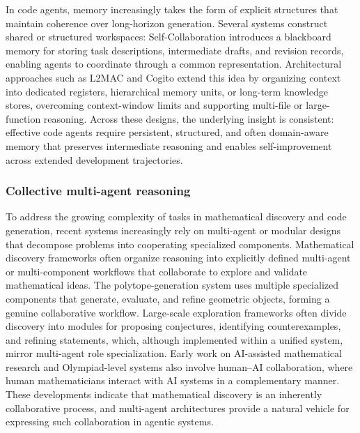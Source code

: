 In code agents, memory increasingly takes the form of explicit structures that maintain coherence
over long-horizon generation. Several systems construct shared or structured workspaces: 
Self-Collaboration \citep{dong2024self} introduces a blackboard memory for storing task descriptions,
intermediate drafts, and revision records, enabling agents to coordinate through a common 
representation. Architectural approaches such as L2MAC \citep{holt2023l2mac} and Cogito 
\citep{li2025cogito} extend this idea by organizing context into dedicated registers, hierarchical 
memory units, or long-term knowledge stores, overcoming context-window limits and supporting 
multi-file or large-function reasoning. Across these designs, the underlying insight is consistent: effective code agents require 
persistent, structured, and often domain-aware memory that preserves intermediate reasoning and 
enables self-improvement across extended development trajectories.





\subsubsection{Collective multi-agent reasoning}
\label{sec:app-math-collaboration}
To address the growing complexity of tasks in mathematical discovery and code generation, recent 
systems increasingly rely on multi-agent or modular designs that decompose problems into 
cooperating specialized components. Mathematical discovery frameworks often organize reasoning into explicitly defined 
multi-agent or multi-component workflows that collaborate to explore and validate mathematical ideas. The polytope-generation system \citep{swirszcz2025advancing} uses multiple specialized components that generate, evaluate, and refine geometric objects, forming a genuine collaborative workflow. Large-scale exploration frameworks \citep{georgiev2025mathematical} often divide discovery into modules for proposing conjectures, identifying counterexamples, and refining statements, which, although implemented within a unified system, mirror multi-agent role specialization. Early work on AI-assisted mathematical research \citep{davies2021advancing} and Olympiad-level systems \citep{hubert2024ai} also involve human--AI collaboration, where human mathematicians interact with AI systems in a complementary manner. These developments indicate that mathematical discovery is an inherently collaborative process, and multi-agent architectures provide a natural vehicle for expressing such collaboration in agentic systems.

